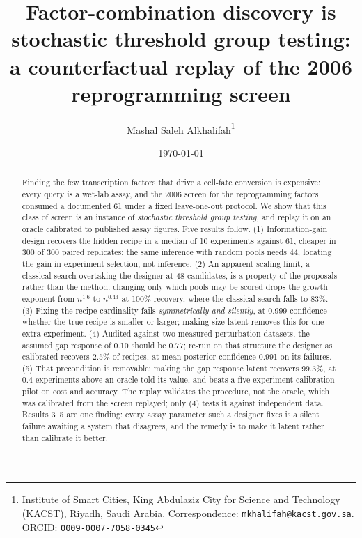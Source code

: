 \documentclass[11pt]{article}
\title{\textbf{Factor-combination discovery is stochastic threshold group
testing: a counterfactual replay of the 2006 reprogramming screen}}
\author{Mashal Saleh Alkhalifah\thanks{Institute of Smart Cities, King
Abdulaziz City for Science and Technology (KACST), Riyadh, Saudi Arabia.
Correspondence: \texttt{mkhalifah@kacst.gov.sa}.
ORCID: \texttt{0009-0007-7058-0345}}}
\date{\today}
\begin{document}
\maketitle

\begin{abstract}
\noindent
Finding the few transcription factors that drive a cell-fate conversion is
expensive: every query is a wet-lab assay, and the 2006 screen for the
reprogramming factors consumed a documented 61 under a fixed leave-one-out
protocol. We show that this class of screen is an instance of
\emph{stochastic threshold group testing}, and replay it on an oracle
calibrated to published assay figures. Five results follow.
(1) Information-gain design recovers the hidden recipe in a median of 10
experiments against 61, cheaper in 300 of 300 paired replicates; the same
inference with random pools needs 44, locating the gain in experiment
selection, not inference. (2) An apparent scaling limit, a
classical search overtaking the designer at 48 candidates, is a property of
the proposals rather than the method: changing only which pools may be scored
drops the growth exponent from $n^{1.6}$ to $n^{0.43}$ at 100\%
recovery, where the classical search falls to 83\%. (3) Fixing the recipe
cardinality fails \emph{symmetrically and silently}, at 0.999 confidence
whether the true recipe is smaller or larger; making size latent removes this
for one extra experiment. (4) Audited against two measured perturbation datasets, the
assumed gap response of 0.10 should be 0.77; re-run on that structure the
designer as calibrated recovers 2.5\% of recipes, at mean posterior confidence
0.991 on its failures. (5) That precondition is removable: making the gap
response latent recovers 99.3\%, at 0.4 experiments above an oracle told its
value, and beats a five-experiment calibration pilot on cost and accuracy. The
replay validates the procedure, not the oracle, which was calibrated from the
screen replayed; only (4) tests it against independent data. Results 3--5 are one finding: every assay parameter such a designer fixes is a
silent failure awaiting a system that disagrees, and the remedy is to make it
latent rather than calibrate it better.
\end{abstract}
\end{document}
